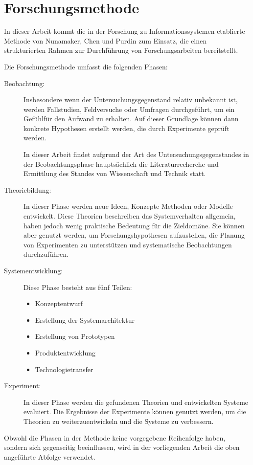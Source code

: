 \chapter{Forschungsmethode}

In dieser Arbeit kommt die in der Forschung zu Informationssystemen etablierte Methode von Nunamaker, Chen und Purdin \cite{nunamaker_systems_1990-1} zum Einsatz, die einen strukturierten Rahmen zur Durchführung von Forschungsarbeiten bereitstellt.


Die Forschungsmethode umfasst die folgenden Phasen:
\begin{description}
\item[Beobachtung:] Insbesondere wenn der Untersuchungsgegenstand relativ unbekannt ist, werden Fallstudien, Feldversuche oder Umfragen durchgeführt, um ein \glqq Gefühl\grqq für den Aufwand zu erhalten. Auf dieser Grundlage können dann konkrete Hypothesen erstellt werden, die durch Experimente geprüft werden. 

In dieser Arbeit findet aufgrund der Art des Untersuchungsgegenstandes in der Beobachtungsphase hauptsächlich die Literaturrecherche und Ermittlung des Standes von Wissenschaft und Technik statt.

\item[Theoriebildung:] In dieser Phase werden neue Ideen, Konzepte Methoden oder Modelle entwickelt. Diese Theorien beschreiben das Systemverhalten allgemein, haben jedoch wenig praktische Bedeutung für die Zieldomäne. Sie können aber genutzt werden, um Forschungshypothesen aufzustellen, die Planung von Experimenten zu unterstützen und systematische Beobachtungen durchzuführen.

\item[Systementwicklung:] Diese Phase besteht aus fünf Teilen:
\begin{itemize}
\item Konzeptentwurf

\item Erstellung der Systemarchitektur

\item Erstellung von Prototypen

\item Produktentwicklung

\item Technologietransfer
\end{itemize}


\item[Experiment:] In dieser Phase werden die gefundenen Theorien und entwickelten Systeme evaluiert. Die Ergebnisse der Experimente können genutzt werden, um die Theorien zu weiterzuentwickeln und die Systeme zu verbessern.

\end{description}

Obwohl die Phasen in der Methode keine vorgegebene Reihenfolge haben, sondern sich gegenseitig beeinflussen, wird in der vorliegenden Arbeit die oben angeführte Abfolge verwendet.

